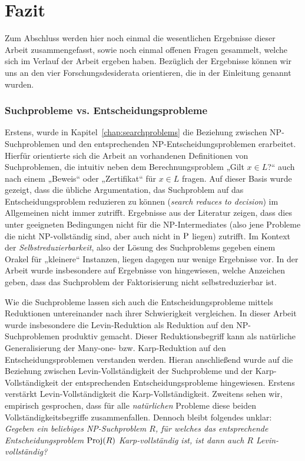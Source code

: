 \chapter{Fazit}\label{chap:conclusion}

Zum Abschluss werden hier noch einmal die wesentlichen Ergebnisse dieser Arbeit zusammengefasst, sowie noch einmal offenen Fragen gesammelt, welche sich im Verlauf der Arbeit ergeben haben.
Bezüglich der Ergebnisse können wir uns an den vier Forschungsdesiderata orientieren, die in der Einleitung genannt wurden.

\subsection*{Suchprobleme vs. Entscheidungsprobleme}

Erstens, wurde in Kapitel~\ref{chap:searchproblems} die Beziehung zwischen NP-Suchproblemen und den entsprechenden NP-Entscheidungsproblemen erarbeitet.
Hierfür orientierte sich die Arbeit an vorhandenen Definitionen von Suchproblemen, die intuitiv neben dem Berechnungsproblem „Gilt $x\in L$?“ auch nach einem „Beweis“ oder „Zertifikat“ für $x\in L$ fragen. %
Auf dieser Basis wurde gezeigt, dass die übliche Argumentation, das Suchproblem auf das Entscheidungsproblem reduzieren zu können (\emph{search reduces to decision}) im Allgemeinen nicht immer zutrifft. Ergebnisse aus der Literatur zeigen, dass dies unter geeigneten Bedingungen nicht für die NP-Intermediates (also jene Probleme die nicht NP-vollständig sind, aber auch nicht in $\P$ liegen) zutrifft.
Im Kontext der \emph{Selbstreduzierbarkeit}, also der Lösung des Suchproblems gegeben einem Orakel für „kleinere“ Instanzen, liegen dagegen nur wenige Ergebnisse vor. In der Arbeit wurde insbesondere auf Ergebnisse von \textcite{harsha_downward_2023} hingewiesen, welche Anzeichen geben, dass das Suchproblem der Faktorisierung nicht selbstreduzierbar ist.

Wie die Suchprobleme lassen sich auch die Entscheidungsprobleme mittels Reduktionen untereinander nach ihrer Schwierigkeit vergleichen. In dieser Arbeit wurde insbesondere die Levin-Reduktion als Reduktion auf den NP-Suchproblemen produktiv gemacht. Dieser Reduktionsbegriff kann als natürliche Generalisierung der Many-one- bzw. Karp-Reduktion auf den Entscheidungsproblemen verstanden werden. Hieran anschließend wurde auf die Beziehung zwischen Levin-Vollständigkeit der Suchprobleme und der Karp-Vollständigkeit der entsprechenden Entscheidungsprobleme hingewiesen. Erstens verstärkt Levin-Vollständigkeit die Karp-Vollständigkeit. Zweitens sehen wir, empirisch gesprochen, dass für alle \emph{natürlichen} Probleme diese beiden Vollständigkeitsbegriffe zusammenfallen. 
Dennoch bleibt folgendes unklar: \emph{Gegeben ein beliebiges NP-Suchproblem $R$, für welches das entsprechende Entscheidungsproblem $\Proj(R)$ Karp-vollständig ist, ist dann auch $R$ Levin-vollständig?}

